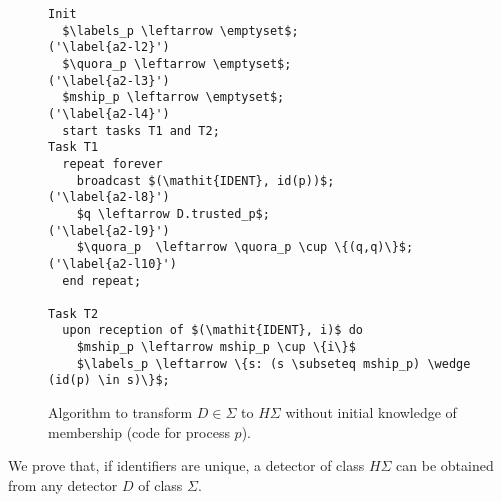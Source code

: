 \documentclass[10pt, conference, compsocconf]{IEEEtran}
\newcommand{\HS}{{H\Sigma}}
\newcommand{\quora}{{\mathit{h\_quora}}}
\newcommand{\labels}{{\mathit{h\_labels}}}
\begin{document}
\begin{figure}
\begin{lstlisting}
Init
  $\labels_p \leftarrow \emptyset$;					('\label{a2-l2}')
  $\quora_p \leftarrow \emptyset$;					('\label{a2-l3}')
  $mship_p \leftarrow \emptyset$;					('\label{a2-l4}')
  start tasks T1 and T2;
Task T1
  repeat forever
    broadcast $(\mathit{IDENT}, id(p))$;				('\label{a2-l8}')
    $q \leftarrow D.trusted_p$; 						('\label{a2-l9}')
    $\quora_p  \leftarrow \quora_p \cup \{(q,q)\}$;		('\label{a2-l10}')
  end repeat;

Task T2	
  upon reception of $(\mathit{IDENT}, i)$ do
    $mship_p \leftarrow mship_p \cup \{i\}$
    $\labels_p \leftarrow \{s: (s \subseteq mship_p) \wedge (id(p) \in s)\}$;  
\end{lstlisting}		
\caption{Algorithm to transform $D \in \Sigma$ to $\HS$ without initial knowledge of membership (code for process $p$).}
\label{Fig-S-to-HS-no-mship}
\end{figure}

We prove that, if identifiers are unique, a detector of class $\HS$ can be obtained from any detector $D$ of class $\Sigma$.
\end{document}
